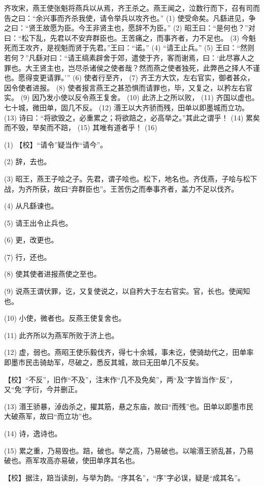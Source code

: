 \documentclass[12pt,UTF8]{ctexbook}
\begin{document}
齐攻宋，燕王使张魁将燕兵以从焉，齐王杀之。燕王闻之，泣数行而下，召有司而告之曰：“余兴事而齐杀我使，请令举兵以攻齐也。” (1) 使受命矣。凡繇进见，争之曰：“贤王故愿为臣。今王非贤主也，愿辞不为臣。” (2) 昭王曰：“是何也？”对曰：“松下乱，先君以不安弃群臣也。王苦痛之，而事齐者，力不足也。 (3) 今魁死而王攻齐，是视魁而贤于先君。”王曰：“诺。” (4) “请王止兵。” (5) 王曰：“然则若何？”凡繇对曰：“请王缟素辟舍于郊，遣使于齐，客而谢焉，曰：‘此尽寡人之罪也。大王贤主也，岂尽杀诸侯之使者哉？然而燕之使者独死，此弊邑之择人不谨也。愿得变更请罪。’” (6) 使者行至齐， (7) 齐王方大饮，左右官实，御者甚众，因令使者进报。 (8) 使者报言燕王之甚恐惧而请罪也，毕，又复之，以矜左右官实。 (9) 因乃发小使以反令燕王复舍。 (10) 此济上之所以败， (11) 齐国以虚也。七十城，微田单，固几不反。 (12) 湣王以大齐骄而残，田单以即墨城而立功。 (13) 诗曰：“将欲毁之，必重累之；将欲踣之，必高举之。”其此之谓乎！ (14) 累矣而不毁，举矣而不踣， (15) 其唯有道者乎！ (16)

(1) 【校】“请令”疑当作“请今”。

(2) 辞，去也。

(3) 昭王，燕王子哙之子。先君，谓子哙也。松下，地名也。齐伐燕，子哙与松下战，为齐所获，故曰“弃群臣也”。王苦伤之而奉事齐者，盖力不足以伐齐。

(4) 从凡繇谏也。

(5) 请王出令止兵也。

(6) 更，改更也。

(7) 行，还也。

(8) 使其使者进报燕使之至也。

(9) 说燕王谓伏罪，讫，又复使说之，以自矜大于左右官实。官，长也。使闻知也。

(10) 小使，微者也。反燕王使复舍也。

(11) 此齐所以为燕军所败于济上也。

(12) 虚，弱也。燕昭王使乐毅伐齐，得七十余城，事未讫，使骑劫代之，田单率即墨市民击骑劫军，尽破之，悉反其城，故曰无田单几不反矣。

【校】“不反”，旧作“不及”，注末作“几不及免矣”，两“及”字皆当作“反”，又“免”字衍，今并删正。

(13) 湣王骄暴，淖齿杀之，擢其筋，悬之东庙，故曰“而残”也。田单以即墨市民大破燕军，故曰“而立功”也。

(14) 诗，逸诗也。

(15) 累之重，乃易毁也。踣，破也。举之高，乃易破也。以喻湣王骄乱甚，乃易破也。燕军攻高亦易破，使田单序其名也。

【校】据注，踣当读剖，与举为韵。“序其名”，“序”字必误，疑是“成其名”。
\end{document}
